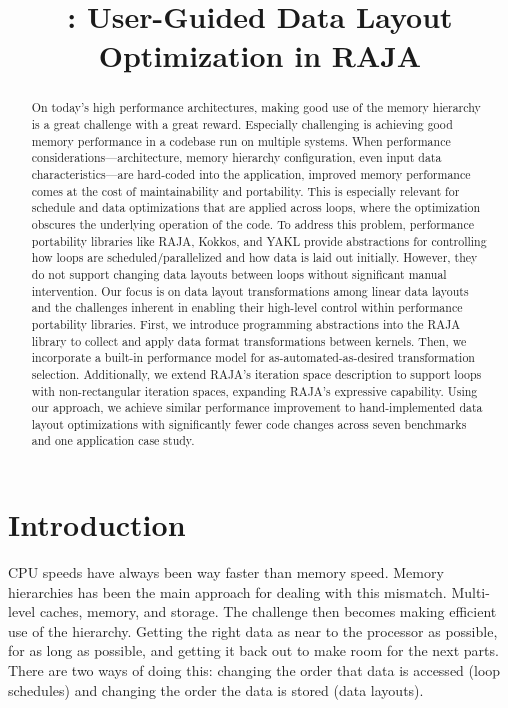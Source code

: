 \documentclass[sigconf,review=true]{acmart}
\title{\FormatDecisions{}: User-Guided Data Layout Optimization in RAJA}
\begin{document}
\begin{abstract}

On today's high performance architectures, making good use of the memory hierarchy is a great challenge with a great reward.
Especially challenging is achieving good memory performance in a codebase run on multiple systems.
When performance considerations---architecture, memory hierarchy configuration, even input data characteristics---are hard-coded into the application, improved memory performance comes at the cost of maintainability and portability. 
This is especially relevant for schedule and data optimizations that are applied across loops, where the optimization obscures the underlying operation of the code.
To address this problem, performance portability libraries like RAJA, Kokkos, and YAKL provide abstractions for controlling how loops are scheduled/parallelized and how data is laid out initially.
However, they do not support changing data layouts between loops without significant manual intervention.
Our focus is on data layout transformations among linear data layouts and the challenges inherent in enabling their high-level control within performance portability libraries.
First, we introduce programming abstractions into the RAJA library to collect and apply data format transformations between kernels.
Then, we incorporate a built-in performance model for as-automated-as-desired transformation selection.
Additionally, we extend RAJA's iteration space description to support loops with non-rectangular iteration spaces, expanding RAJA's expressive capability.
Using our approach, we achieve similar performance improvement to hand-implemented data layout optimizations with significantly fewer code changes across seven benchmarks and one application case study.
\end{abstract}
\maketitle
\def\@textbottom{\vskip \z@ \@plus 1pt}

\section{Introduction}

CPU speeds have always been way faster than memory speed.
Memory hierarchies has been the main approach for dealing with this mismatch.
Multi-level caches, memory, and storage.
The challenge then becomes making efficient use of the hierarchy. 
Getting the right data as near to the processor as possible, for as long as possible, and getting it back out to make room for the next parts.
There are two ways of doing this: changing the order that data is accessed (loop schedules) and changing the order the data is stored (data layouts). 
\end{document}
